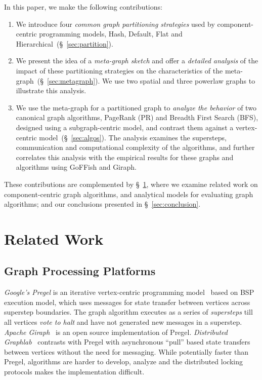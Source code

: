\documentclass[10pt,conference, compsocconf]{IEEEtran}
\begin{document}
In this paper, we make the following contributions:
\begin{enumerate}[noitemsep,topsep=0pt,parsep=0pt,partopsep=0pt]
\item We introduce four \emph{common graph partitioning strategies} used by component-centric programming models, Hash, Default, Flat and Hierarchical~(\S~\ref{sec:partition}).
\item We present the idea of a \emph{meta-graph sketch} and offer a \emph{detailed analysis} of the impact of these partitioning strategies on the characteristics of the meta-graph~(\S~\ref{sec:metagraph}). We use two spatial and three powerlaw graphs to illustrate this analysis. 
\item We use the meta-graph for a partitioned graph to \emph{analyze the behavior} of two canonical graph algorithms, PageRank (PR) and Breadth First Search (BFS), designed using a subgraph-centric model, and contrast them against a vertex-centric model~(\S~\ref{sec:algos}). The analysis examines the supersteps, communication and computational complexity of the algorithms, and further correlates this analysis with the empirical results for these graphs and algorithms using GoFFish and Giraph.
\end{enumerate}

These contributions are complemented by \S~\ref{sec:related}, where we examine related work on component-centric graph algorithms, and analytical models for evaluating graph algorithms; and our conclusions presented in \S~\ref{sec:conclusion}.


\section{Related Work}\label{sec:related}



\subsection{Graph Processing Platforms} 
\emph{Google's Pregel} is an iterative vertex-centric programming model~\cite{pregel} based on  BSP execution model, which uses messages for state transfer between vertices across superstep boundaries. The graph algorithm executes as a series of \emph{supersteps} till all vertices \emph{vote to halt} and have not generated new messages in a superstep. \emph{Apache Giraph}~\cite{giraph} is an open source implementation of Pregel.
\emph{Distributed Graphlab}~\cite{graphlab} contrasts with Pregel with asynchronous ``pull'' based state transfers between vertices without the need for messaging. 
While potentially faster than Pregel, algorithms are harder to develop, analyze and the distributed locking protocols makes the implementation difficult.
\end{document}
